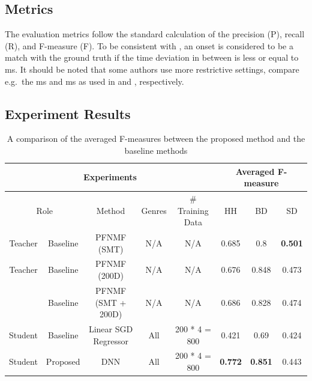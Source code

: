 \documentclass{article}
\begin{document}
\subsection{Metrics}
The evaluation metrics follow the standard calculation of the precision (P), recall (R), and F-measure (F). To be consistent with \cite{Gillet2008, Wu2015a, Southall2016}, an onset is considered to be a match with the ground truth if the time deviation in between is less or equal to \unit[50]{ms}. It should be noted that some authors use more restrictive settings, compare e.g.\ the \unit[30]{ms} and \unit[20]{ms} as used in \cite{Paulus2009a} and \cite{Vogl2017}, respectively.  

\subsection{Experiment Results}

\begin{table}[]
\centering
\begin{tabular}{cccccccc}
\hline
\multicolumn{5}{c}{Experiments}                                                & \multicolumn{3}{c}{Averaged F-measure}           \\ \hline
\multicolumn{2}{c}{Role} & Method                  & Genres & \# Training Data & HH             & BD             & SD             \\ \hline
Teacher    & Baseline    & PFNMF (SMT)             & N/A    & N/A              & 0.685          & 0.8            & \textbf{0.501} \\
Teacher    & Baseline    & PFNMF (200D)       & N/A    & N/A              & 0.676          & 0.848          & 0.473          \\
           & Baseline    & PFNMF (SMT + 200D) & N/A    & N/A              & 0.686          & 0.828          & 0.474          \\
Student    & Baseline    & Linear SGD Regressor    & All    & 200 * 4 = 800    & 0.421          & 0.69           & 0.424          \\
Student    & Proposed    & DNN                     & All    & 200 * 4 = 800    & \textbf{0.772} & \textbf{0.851} & 0.443          \\ \hline
\end{tabular}
\caption{A comparison of the averaged F-measures between the proposed method and the baseline methods}
\label{tab:all_results}
\end{table}
\end{document}
